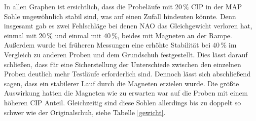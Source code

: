 In allen Graphen ist ersichtlich, dass die Probeläufe mit $20\,\%$ CIP in der MAP Sohle ungewöhnlich stabil sind, was auf einen Zufall hindeuten könnte. Denn insgesamt gab es zwei Fehlschläge bei denen NAO das Gleichgewicht verloren hat, einmal mit $20\,\%$ und einmal mit $40\,\%$, beides mit Magneten an der Rampe. Außerdem wurde bei früheren Messungen eine erhöhte Stabilität bei $40\,\%$ im Vergleich zu anderen Proben und dem Grundschuh festgestellt. Dies lässt darauf schließen, dass für eine Sicherstellung der Unterschiede zwischen den einzelnen Proben deutlich mehr Testläufe erforderlich sind. Dennoch lässt sich abschließend sagen, dass ein stabilerer Lauf durch die Magneten erzielen wurde. Die größte Auswirkung hatten die Magneten wie zu erwarten war auf die Proben mit einem höheren CIP Anteil. Gleichzeitig sind diese Sohlen allerdings bis zu doppelt so schwer wie der Originalschuh, siehe Tabelle \ref{gewicht}. 



%
%
%
%

